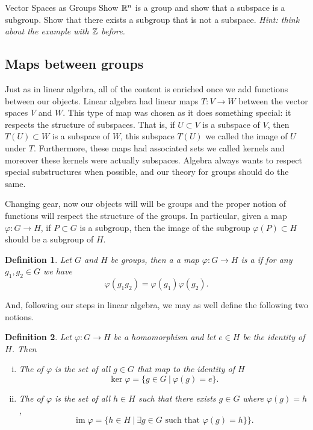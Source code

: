 \documentclass{article}
\theoremstyle{indented}
\newtheorem{definition}{Definition}
\newcommand{\image}{\operatorname{im}}
\begin{document}
\begin{problem}{Vector Spaces as Groups}{}
Show $\mathbb{R}^n$ is a group and show that a subspace is a subgroup. Show that there exists a subgroup that is not a subspace. \emph{Hint: think about the example with $\mathbb{Z}$ before.}
\end{problem}

\subsection{Maps between groups}
Just as in linear algebra, all of the content is enriched once we add functions between our objects. Linear algebra had linear maps $T\colon V \to W$ between the vector spaces $V$ and $W$. This type of map was chosen as it does something special: it respects the structure of subspaces. That is, if $U\subset V$ is a subspace of $V$, then $T(U) \subset W$ is a subspace of $W$, this subspace $T(U)$ we called the image of $U$ under $T$. Furthermore, these maps had associated sets we called kernels and moreover these kernels were actually subspaces. Algebra always wants to respect special substructures when possible, and our theory for groups should do the same.

Changing gear, now our objects will will be groups and the proper notion of functions will respect the structure of the groups. In particular, given a map $\varphi \colon G \to H$, if $P \subset G$ is a subgroup, then the image of the subgroup $\varphi(P)\subset H$ should be a subgroup of $H$.

\begin{definition}
    Let $G$ and $H$ be groups, then a a map $\varphi \colon G \to H$ is a  if for any $g_1,g_2\in G$ we have
    \begin{equation}
    \label{eq:homomorphism}
        \varphi(g_1g_2)=\varphi(g_1)\varphi(g_2).
    \end{equation}
\end{definition}

And, following our steps in linear algebra, we may as well define the following two notions.

\begin{definition}
Let $\varphi \colon G \to H$ be a homomorphism and let $e \in H$ be the identity of $H$. Then
\begin{enumerate}[i.]
    \item The  of $\varphi$ is the set of all $g\in G$ that map to the identity of $H$
    \[
        \ker \varphi = \{g \in G ~\vert~ \varphi(g)=e\}.
    \]
    \item The  of $\varphi$ is the set of all $h\in H$ such that there exists $g \in G$ where $\varphi(g)=h$,
    \[
        \image \varphi = \{h \in H ~\vert~ \exists g \in G \textrm{~such that~} \varphi(g)=h\}\}.
    \]
\end{enumerate}
\end{definition}
\end{document}
